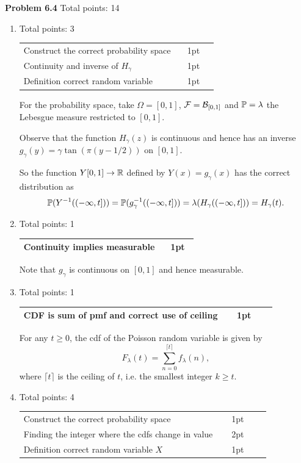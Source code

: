 \documentclass{lecturenotes}
\newcommand{\rubric}[1]{#1}
\begin{document}
\textbf{Problem 6.4} \rubric{Total points: 14}

\begin{enumerate}[label=(\alph*)]
\item \rubric{ Total points: 3 \hfill

\begin{tabular}{p{0.8\linewidth}p{0.15\linewidth}}
\hline
Construct the correct probability space & 1pt\\
Continuity and inverse of $H_\gamma$ & 1pt\\
Definition correct random variable & 1pt\\
\hline
\end{tabular}

}
For the probability space, take $\Omega = [0,1]$, $\mathcal F = \mathcal B_{[0,1]}$ and $\mathbb P = \lambda$ the Lebesgue measure restricted to $[0,1]$. 

Observe that the function $H_\gamma(z)$ is continuous and hence has an inverse $g_\gamma(y) = \gamma \tan(\pi(y - 1/2))$ on $[0,1]$.

So the function $Y [0,1] \to \mathbb R$ defined by $Y(x) = g_\gamma(x)$ has the correct distribution as
\[
	\mathbb P(Y^{-1}((-\infty,t])) = \mathbb P(g_\gamma^{-1}((-\infty, t])) = \lambda(H_\gamma((-\infty,t])) = H_\gamma(t).
\]
\item \rubric{ Total points: 1 \hfill

\begin{tabular}{p{0.8\linewidth}p{0.15\linewidth}}
\hline
Continuity implies measurable & 1pt\\
\hline
\end{tabular}

} 
Note that $g_\gamma$ is continuous on $[0,1]$ and hence measurable.
\item \rubric{ Total points: 1 \hfill

\begin{tabular}{p{0.8\linewidth}p{0.15\linewidth}}
\hline
CDF is sum of pmf and correct use of ceiling & 1pt\\
\hline
\end{tabular}

} 

For any $t \ge 0$, the cdf of the Poisson random variable is given by
\[
	F_\lambda(t) = \sum_{n = 0}^{\lceil t \rceil} f_\lambda(n),
\]
where $\lceil t \rceil$ is the ceiling of $t$, i.e. the smallest integer $k \ge t$.
\item \rubric{ Total points: 4 \hfill

\begin{tabular}{p{0.8\linewidth}p{0.15\linewidth}}
\hline
Construct the correct probability space & 1pt\\
Finding the integer where the cdfs change in value & 2pt\\
Definition correct random variable $X$ & 1pt\\
\hline
\end{tabular}

}
\end{enumerate}
\end{document}
